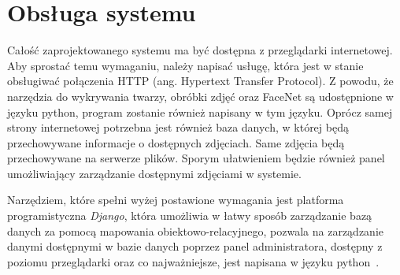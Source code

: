 \pagebreak


\section{Obsługa systemu}

Całość zaprojektowanego systemu ma być dostępna z przeglądarki internetowej.
Aby sprostać temu wymaganiu, należy napisać usługę, która jest w stanie obsługiwać połączenia
HTTP (ang. Hypertext Transfer Protocol).
Z powodu, że narzędzia do wykrywania twarzy, obróbki zdjęć oraz FaceNet są udostępnione w języku python,
program zostanie również napisany w tym języku.
Oprócz samej strony internetowej potrzebna jest również baza danych,
w której będą przechowywane informacje o dostępnych zdjęciach.
Same zdjęcia będą przechowywane na serwerze plików.
Sporym ułatwieniem będzie również panel umożliwiający zarządzanie dostępnymi zdjęciami w systemie.

Narzędziem, które spełni wyżej postawione wymagania jest platforma programistyczna \textit{Django},
która umożliwia w łatwy sposób zarządzanie bazą danych za pomocą mapowania obiektowo-relacyjnego,
pozwala na zarządzanie danymi dostępnymi w bazie danych poprzez panel administratora, dostępny
z poziomu przeglądarki oraz co najważniejsze, jest napisana w języku python~\cite{djangodoc}.